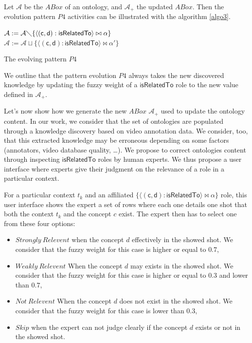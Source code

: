 		Let $\mathcal{A}$ be the $ABox$ of an ontology, and $\mathcal{A_{+}}$ 
		the updated $ABox$. %
		 Then the evolution pattern $P4$ activities can be illustrated with the
		algorithm \ref{algo3}.
		
		\begin{algorithm}
				\label{algo3}
					{
					 $\mathcal{A} := \mathcal{A}  \diagdown \{
					 \langle{}(\mathsf{c},\mathsf{d}):
							\mathsf{isRelatedTo}\rangle{} \bowtie \alpha\}$\\
					$\mathcal{A} := \mathcal{A} \sqcup \{ \langle{}(\mathsf{c},\mathsf{d}):
							\mathsf{isRelatedTo}\rangle{} \bowtie \alpha'\}$\\
					}
				\caption{The evolving pattern $P4$}
		\end{algorithm}

		We outline that the pattern evolution $P4$ always takes the new discovered knowledge by 
		updating the fuzzy weight of a $\mathsf{isRelatedTo}$ role to 
		the new value defined in $\mathcal{A_{+}}$.

		Let's now show how we generate the new $ABox$ $\mathcal{A_{+}}$ used to update the ontology content. 
		In our work, we consider that the set of ontologies are populated through
		a knowledge discovery based 
		on video annotation data. We consider, too, that this extracted knowledge may
		be erroneous depending on some factors (annotators, video database quality, \dots). 
		We propose  to correct ontologies content 
		through inspecting $\mathsf{isRelatedTo}$ roles by human experts. 
		We thus propose a user interface where experts give their judgment on the relevance of a role in a
		particular context.

		For a particular context $t_{k}$ and an affiliated $\{ \langle{}(\mathsf{c},\mathsf{d}): 
		\mathsf{isRelatedTo}\rangle{} \bowtie \alpha\}$ role, this user interface shows
		the expert a set of rows where each one details one shot that both the context 
		$t_{k}$ and the concept $c$ exist. The expert then has to select one from these four options:
		\begin{itemize}
			\item $Strongly~Relevent$ when the concept $d$ effectively in the showed shot. We 
				consider that the fuzzy weight for this case is higher or equal to $0.7$,
			\item $Weakly~Relevent$ When the concept $d$ may exists in the showed shot. We 
				consider that the fuzzy weight for this case is higher or equal to $0.3$ 
				and lower than $0.7$,
			\item $Not~Relevent$ When the concept $d$ does not exist in the showed shot. We 
				consider that the fuzzy weight for this case is lower than $0.3$,
			\item $Skip$ when the expert can not judge clearly if the concept $d$ 
				exists or not in the showed shot.
		\end{itemize} 
		
